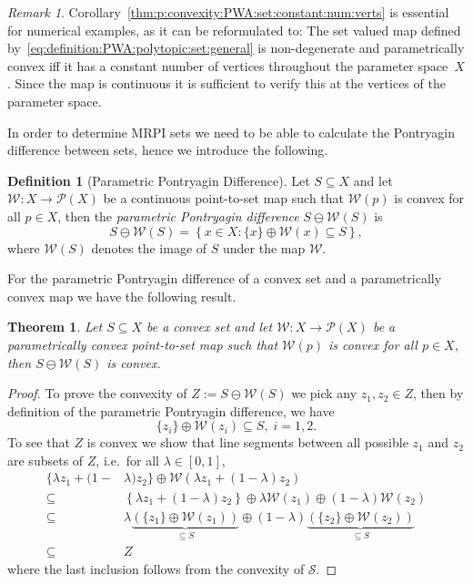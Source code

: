 \documentclass[journal]{IEEEtran}
\newcounter{thmcount}
\newtheorem{thm}[thmcount]{Theorem}
\theoremstyle{remark}
\newtheorem{rem}[thmcount]{Remark}
\theoremstyle{definition}
\newtheorem{defi}[thmcount]{Definition}
\begin{document}
%
\begin{rem}
Corollary~\ref{thm:p:convexity:PWA:set:constant:num:verts} is essential for numerical examples, as it can be reformulated to:
%
The set valued map defined by~\eqref{eq:definition:PWA:polytopic:set:general} is non-degenerate and parametrically convex iff 
it has a constant number of vertices throughout the parameter space~$X$.
%
Since the map is continuous it is sufficient to verify this at the vertices of the parameter space.
%
\end{rem}
%
In order to determine MRPI sets we need to be able to calculate the Pontryagin difference between sets, hence we introduce
the following.
%
\begin{defi}[Parametric Pontryagin Difference]\label{def:parametric:pontryagin:difference}
  Let $S\subseteq X$ and let $\mathcal W:X\to\mathscr P(X)$ be a continuous point-to-set map such that
  $\mathcal W(p)$ is convex for all $p\in X$, then the \emph{parametric Pontryagin difference} 
  $S\ominus \mathcal W(S)$ is 
  \begin{equation}\label{eq:definition:parametric:pontryagin:difference}
    S\ominus \mathcal W(S) = \left\{x\in X: \{x\} \oplus \mathcal W(x)\subseteq S\right\},
  \end{equation}
  where $\mathcal W(S)$ denotes the image of $S$ under the map $\mathcal W$. 
\end{defi}
%
For the parametric Pontryagin difference of a convex set and a parametrically convex map we 
have the following result.
%
\begin{thm}\label{thm:convexity:of:pontryagin:difference}
  Let $S\subseteq X$ be a convex set and let $\mathcal W:X\rightarrow\mathscr P(X)$ be a parametrically convex point-to-set
  map such that $\mathcal W(p)$ is convex for all $p\in X$, then $S\ominus \mathcal W(S)$ is convex.
\end{thm}
%
\begin{proof}
To prove the convexity of $ Z :=  S\ominus \mathcal W( S)$ we pick any $z_1,z_2\in Z$, then
by definition of the parametric Pontryagin difference, we have
%
\begin{equation}
  \{z_i\} \oplus \mathcal W(z_i) \subseteq S,\; i=1,2.
\end{equation}
%
To see that $ Z$ is convex we show that line segments between
all possible $z_1$ and $z_2$ are subsets of $ Z$, i.e.~for all $\lambda \in [0,1]$,
\begin{equation}
\begin{aligned}
  \{ \lambda z_1 + (1-&\lambda)z_2
  \}\oplus \mathcal W\left( \lambda z_1 + (1-\lambda)z_2\right)\\
  \subseteq&\left\{ \lambda z_1 + (1-\lambda)z_2
  \right\}\oplus \lambda \mathcal W(z_1) \oplus (1-\lambda)
  \mathcal W(z_2)\\
  \subseteq &\lambda\underbrace{(\{z_1\}\oplus \mathcal W(z_1))}_{\subseteq S}\oplus
  (1-\lambda)\underbrace{(\{z_2\}\oplus \mathcal W(z_2))}_{\subseteq S}\\
  \subseteq& Z
\end{aligned}
\end{equation}
%
where the last inclusion follows from the convexity of $\mathcal S$.
\end{proof}
\end{document}
